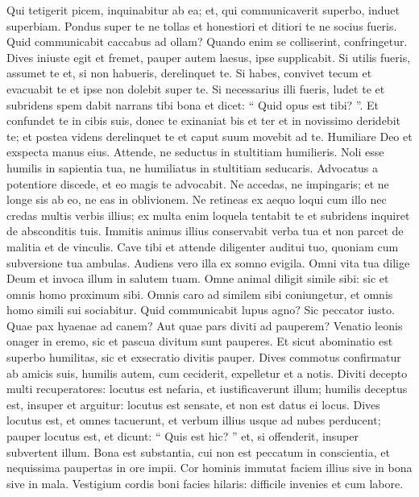 \begin{biblechapter}
\begin{biblechapter}
\begin{biblechapter}
\begin{biblechapter}
\begin{biblechapter}
\begin{biblechapter}
\begin{biblechapter}
\begin{biblechapter}
\begin{biblechapter}
\begin{biblechapter}
\begin{biblechapter}
\begin{biblechapter}
\begin{biblechapter}
\verse Qui tetigerit picem, inquinabitur ab ea;
 et, qui communicaverit superbo, induet superbiam.
 \verse Pondus super te ne tollas
 et honestiori et ditiori te ne socius fueris.
 \verse Quid communicabit caccabus ad ollam?
 Quando enim se colliserint, confringetur.
 \verse Dives iniuste egit et fremet,
 pauper autem laesus, ipse supplicabit.
 \verse Si utilis fueris, assumet te
 et, si non habueris, derelinquet te.
 \verse Si habes, convivet tecum et evacuabit te
 et ipse non dolebit super te.
 \verse Si necessarius illi fueris, ludet te
 et subridens spem dabit narrans tibi bona
 et dicet: “ Quid opus est tibi? ”.
 \verse Et confundet te in cibis suis,
 donec te exinaniat bis et ter
 et in novissimo deridebit te;
 et postea videns derelinquet te
 et caput suum movebit ad te.
 \verse Humiliare Deo et exspecta manus eius.
 \verse Attende, ne seductus in stultitiam humilieris.
 \verse Noli esse humilis in sapientia tua,
 ne humiliatus in stultitiam seducaris.
 \verse Advocatus a potentiore discede,
 et eo magis te advocabit.
 \verse Ne accedas, ne impingaris;
 et ne longe sis ab eo, ne eas in oblivionem.
 \verse Ne retineas ex aequo loqui cum illo
 nec credas multis verbis illius;
 ex multa enim loquela tentabit te
 et subridens inquiret de absconditis tuis.
 \verse Immitis animus illius conservabit verba tua
 et non parcet de malitia et de vinculis.
 \verse Cave tibi et attende diligenter auditui tuo,
 quoniam cum subversione tua ambulas.
 \verse Audiens vero illa
 ex somno evigila.
 \verse Omni vita tua dilige Deum
 et invoca illum in salutem tuam.
 \verse Omne animal diligit simile sibi:
 sic et omnis homo proximum sibi.
 \verse Omnis caro ad similem sibi coniungetur,
 et omnis homo simili sui sociabitur.
 \verse Quid communicabit lupus agno?
 Sic peccator iusto.
 \verse Quae pax hyaenae ad canem?
 Aut quae pars diviti ad pauperem?
 \verse Venatio leonis onager in eremo,
 sic et pascua divitum sunt pauperes.
 \verse Et sicut abominatio est superbo humilitas,
 sic et exsecratio divitis pauper.
 \verse Dives commotus confirmatur ab amicis suis,
 humilis autem, cum ceciderit, expelletur et a notis.
 \verse Diviti decepto multi recuperatores:
 locutus est nefaria, et iustificaverunt illum;
 \verse humilis deceptus est, insuper et arguitur:
 locutus est sensate, et non est datus ei locus.
 \verse Dives locutus est, et omnes tacuerunt,
 et verbum illius usque ad nubes perducent;
 \verse pauper locutus est, et dicunt: “ Quis est hic? ”
 et, si offenderit, insuper subvertent illum.
 \verse Bona est substantia, cui non est peccatum in conscientia,
 et nequissima paupertas in ore impii.
 \verse Cor hominis immutat faciem illius
 sive in bona sive in mala.
 \verse Vestigium cordis boni facies hilaris:
 difficile invenies et cum labore.
 

\end{biblechapter}
\end{biblechapter}
\end{biblechapter}
\end{biblechapter}
\end{biblechapter}
\end{biblechapter}
\end{biblechapter}
\end{biblechapter}
\end{biblechapter}
\end{biblechapter}
\end{biblechapter}
\end{biblechapter}
\end{biblechapter}
